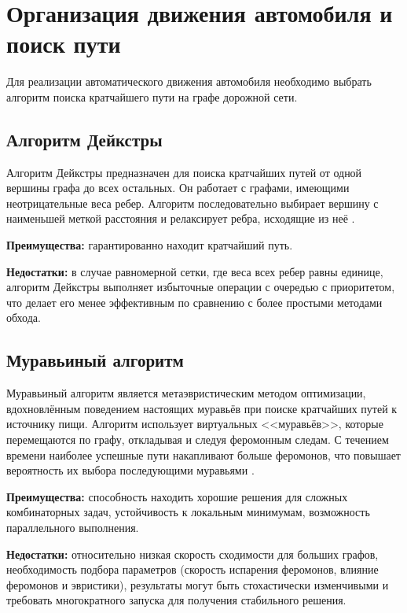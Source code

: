 \section{Организация движения автомобиля и поиск пути}

Для реализации автоматического движения автомобиля необходимо выбрать алгоритм поиска кратчайшего пути на графе дорожной сети.

\subsection{Алгоритм Дейкстры}

Алгоритм Дейкстры предназначен для поиска кратчайших путей от одной вершины графа до всех остальных. Он работает с графами, имеющими неотрицательные веса ребер. Алгоритм последовательно выбирает вершину с наименьшей меткой расстояния и релаксирует ребра, исходящие из неё \cite{algorithmica_dijkstra}.

\textbf{Преимущества:} гарантированно находит кратчайший путь.

\textbf{Недостатки:} в случае равномерной сетки, где веса всех ребер равны единице, алгоритм Дейкстры выполняет избыточные операции с очередью с приоритетом, что делает его менее эффективным по сравнению с более простыми методами обхода.

\subsection{Муравьиный алгоритм}

Муравьиный алгоритм является метаэвристическим методом оптимизации, вдохновлённым поведением настоящих муравьёв при поиске кратчайших путей к источнику пищи. Алгоритм использует виртуальных <<муравьёв>>, которые перемещаются по графу, откладывая и следуя феромонным следам. С течением времени наиболее успешные пути накапливают больше феромонов, что повышает вероятность их выбора последующими муравьями \cite{donntu_murzin_muravyinye_algoritmy}.

\textbf{Преимущества:} способность находить хорошие решения для сложных комбинаторных задач, устойчивость к локальным минимумам, возможность параллельного выполнения.

\textbf{Недостатки:} относительно низкая скорость сходимости для больших графов, необходимость подбора параметров (скорость испарения феромонов, влияние феромонов и эвристики), результаты могут быть стохастически изменчивыми и требовать многократного запуска для получения стабильного решения.

